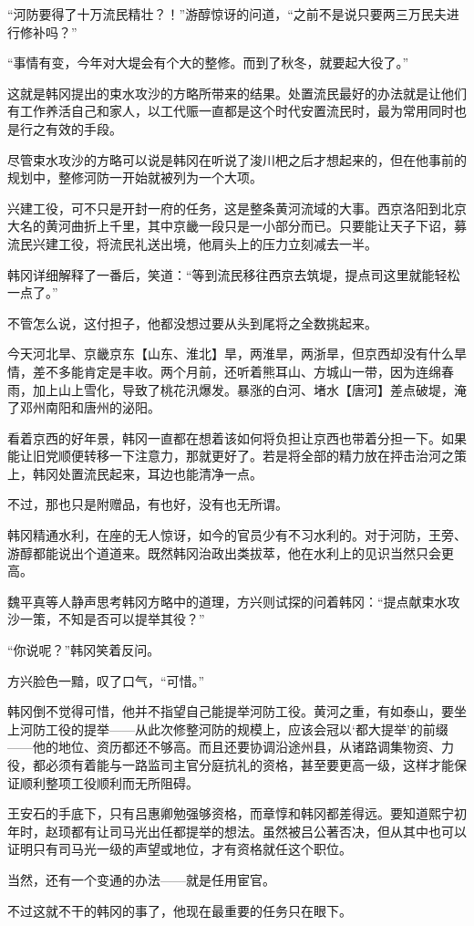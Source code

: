 “河防要得了十万流民精壮？！”游醇惊讶的问道，“之前不是说只要两三万民夫进行修补吗？”

“事情有变，今年对大堤会有个大的整修。而到了秋冬，就要起大役了。”

这就是韩冈提出的束水攻沙的方略所带来的结果。处置流民最好的办法就是让他们有工作养活自己和家人，以工代赈一直都是这个时代安置流民时，最为常用同时也是行之有效的手段。

尽管束水攻沙的方略可以说是韩冈在听说了浚川杷之后才想起来的，但在他事前的规划中，整修河防一开始就被列为一个大项。

兴建工役，可不只是开封一府的任务，这是整条黄河流域的大事。西京洛阳到北京大名的黄河曲折上千里，其中京畿一段只是一小部分而已。只要能让天子下诏，募流民兴建工役，将流民礼送出境，他肩头上的压力立刻减去一半。

韩冈详细解释了一番后，笑道：“等到流民移往西京去筑堤，提点司这里就能轻松一点了。”

不管怎么说，这付担子，他都没想过要从头到尾将之全数挑起来。

今天河北旱、京畿京东【山东、淮北】旱，两淮旱，两浙旱，但京西却没有什么旱情，差不多能肯定是丰收。两个月前，还听着熊耳山、方城山一带，因为连绵春雨，加上山上雪化，导致了桃花汛爆发。暴涨的白河、堵水【唐河】差点破堤，淹了邓州南阳和唐州的泌阳。

看着京西的好年景，韩冈一直都在想着该如何将负担让京西也带着分担一下。如果能让旧党顺便转移一下注意力，那就更好了。若是将全部的精力放在抨击治河之策上，韩冈处置流民起来，耳边也能清净一点。

不过，那也只是附赠品，有也好，没有也无所谓。

韩冈精通水利，在座的无人惊讶，如今的官员少有不习水利的。对于河防，王旁、游醇都能说出个道道来。既然韩冈治政出类拔萃，他在水利上的见识当然只会更高。

魏平真等人静声思考韩冈方略中的道理，方兴则试探的问着韩冈：“提点献束水攻沙一策，不知是否可以提举其役？”

“你说呢？”韩冈笑着反问。

方兴脸色一黯，叹了口气，“可惜。”

韩冈倒不觉得可惜，他并不指望自己能提举河防工役。黄河之重，有如泰山，要坐上河防工役的提举——从此次修整河防的规模上，应该会冠以‘都大提举’的前缀——他的地位、资历都还不够高。而且还要协调沿途州县，从诸路调集物资、力役，都必须有着能与一路监司主官分庭抗礼的资格，甚至要更高一级，这样才能保证顺利整项工役顺利而无所阻碍。

王安石的手底下，只有吕惠卿勉强够资格，而章惇和韩冈都差得远。要知道熙宁初年时，赵顼都有让司马光出任都提举的想法。虽然被吕公著否决，但从其中也可以证明只有司马光一级的声望或地位，才有资格就任这个职位。

当然，还有一个变通的办法——就是任用宦官。

不过这就不干的韩冈的事了，他现在最重要的任务只在眼下。


